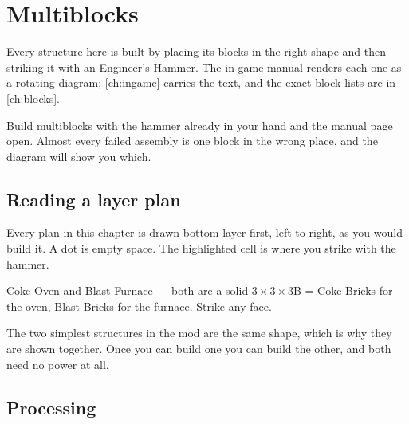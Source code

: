 \chapter{Multiblocks}
\label{ch:multiblocks}

Every structure here is built by placing its blocks in the right shape and then striking it with an
Engineer's Hammer. The in-game manual renders each one as a rotating diagram; \autoref{ch:ingame}
carries the text, and the exact block lists are in \autoref{ch:blocks}.

\begin{ietip}
Build multiblocks with the hammer already in your hand and the manual page open. Almost every failed
assembly is one block in the wrong place, and the diagram will show you which.
\end{ietip}

\section{Reading a layer plan}

Every plan in this chapter is drawn bottom layer first, left to right, as you would build it. A
dot is empty space. The highlighted cell is where you strike with the hammer.

\begin{mbplan}{Coke Oven and Blast Furnace --- both are a solid $3\times3\times3$}{B = Coke Bricks
for the oven, Blast Bricks for the furnace. Strike any face.}
\hspace{6mm}
\hspace{6mm}
\end{mbplan}

\begin{ietip}
The two simplest structures in the mod are the same shape, which is why they are shown together.
Once you can build one you can build the other, and both need no power at all.
\end{ietip}

\section{Processing}

